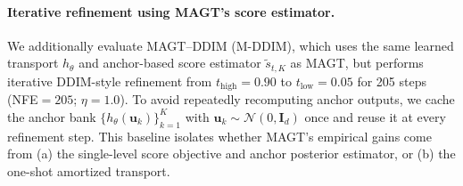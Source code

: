 \documentclass[12pt]{article}
\theoremstyle{definition} %
\providecommand{\method}{MAGT} %
\newcommand{\cN}{\mathcal{N}}
\begin{document}
\paragraph{Iterative refinement using \method{}'s score estimator.}
We additionally evaluate \method{}--DDIM (M-DDIM), which uses the same learned transport $h_{\theta}$ and anchor-based score estimator $\widetilde s_{t,K}$ as \method{}, but performs iterative DDIM-style refinement from $t_{\mathrm{high}}=0.90$ to $t_{\mathrm{low}}=0.05$ for 205 steps (NFE$=205$; $\eta=1.0$).
To avoid repeatedly recomputing anchor outputs, we cache the anchor bank $\{h_{\theta}(\bm u_k)\}_{k=1}^K$ with $\bm u_k\sim\cN(0,\bm{I}_d)$ once and reuse it at every refinement step.
This baseline isolates whether \method{}'s empirical gains come from (a) the single-level score objective and anchor posterior estimator, or (b) the one-shot amortized transport.

\begingroup
 \setlength{\tabcolsep}{3pt} 
 \renewcommand{\arraystretch}{0.82}
 \setlength{\aboverulesep}{0.5 pt} 
 \setlength{\belowrulesep}{0.5pt}
 \setlength{\abovetopsep}{0pt}
 \setlength{\belowbottomsep}{0pt}
 \setlength{\cmidrulekern}{0pt} 
\end{document}
